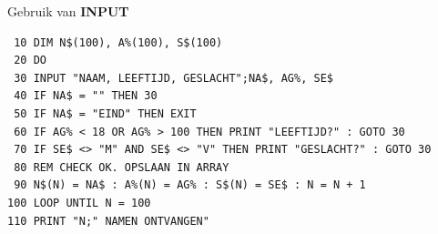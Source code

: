 \begin{description}[leftmargin=2cm,style=nextline]
\item [Voorbeeld:]  Gebruik van {\bf INPUT}

\begin{tcolorbox}[colback=black,coltext=white]
\verbatimfont{\codefont}
\begin{verbatim}
 10 DIM N$(100), A%(100), S$(100)
 20 DO
 30 INPUT "NAAM, LEEFTIJD, GESLACHT";NA$, AG%, SE$
 40 IF NA$ = "" THEN 30
 50 IF NA$ = "EIND" THEN EXIT
 60 IF AG% < 18 OR AG% > 100 THEN PRINT "LEEFTIJD?" : GOTO 30
 70 IF SE$ <> "M" AND SE$ <> "V" THEN PRINT "GESLACHT?" : GOTO 30
 80 REM CHECK OK. OPSLAAN IN ARRAY
 90 N$(N) = NA$ : A%(N) = AG% : S$(N) = SE$ : N = N + 1
100 LOOP UNTIL N = 100
110 PRINT "N;" NAMEN ONTVANGEN"
\end{verbatim}
\end{tcolorbox}
\end{description}


\newpage
